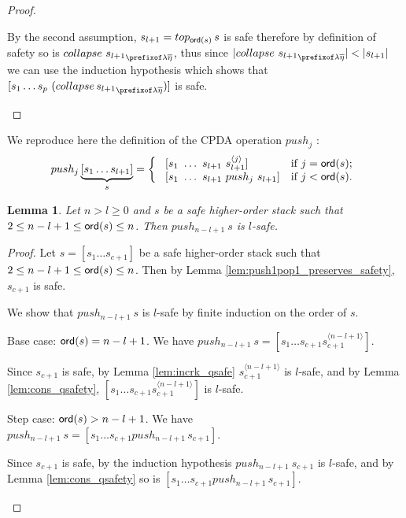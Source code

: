 \documentclass[a4paper]{article}
\newtheorem{lemma}{Lemma}[section]
\theoremstyle{remark}
\theoremstyle{definition}
\begin{document}
\begin{proof}
\begin{itemize}
By the second assumption, $s_{l+1} = top_{{\sf ord}(s)}\,s$ is safe therefore by definition
of safety so is $collapse~{s_{l+1}}_{\prefixof\lambda\overline\eta}$, thus
since $|collapse~{s_{l+1}}_{\prefixof\lambda\overline\eta}| < |s_{l+1}|$ we can use the induction hypothesis which shows that $[s_1 \ldots s_p\ (collapse\, {s_{l+1}}_{\prefixof\lambda\overline\eta}) ]$ is safe.
\qedhere
\end{itemize}
\end{proof}

We reproduce here the definition of the CPDA operation $push_j$ \cite{hmos-lics08}:
$$ push_j \underbrace{[ s_1 \ldots s_{l+1} ]}_{s} =
\left\{
  \begin{array}{ll}
\    [s_1\ \ldots\ s_{l+1}\ s_{l+1}^{\langle j \rangle}]  &\hbox{if $j = {\sf ord}(s)$;}\\
\    [s_1\ \ldots\ s_{l+1}\ push_j\ s_{l+1}]  &\hbox{if $j<{\sf ord}(s)$.}
 \end{array}
\right.
$$

\begin{lemma}
\label{lem:pushj_safe_implies_l-safe} Let $n>l\geq 0$ and $s$ be a safe higher-order stack such that $2 \leq n-l+1 \leq {\sf ord}(s) \leq n$. Then $push_{n-l+1}\ s$ is $l$-safe.
\end{lemma}
\begin{proof}
Let $s=[s_1 \ldots s_{c+1}]$ be a safe higher-order stack such that $2 \leq n-l+1 \leq {\sf ord}(s) \leq n$. Then by Lemma \ref{lem:push1pop1_preserves_safety}, $s_{c+1}$ is safe.

We show that $push_{n-l+1}~s$ is $l$-safe by finite induction on the order of $s$.
    \begin{compactitem}
      \item Base case: ${\sf ord}(s) = n-l+1 $. We have
    $push_{n-l+1}~s = [ s_1 \ldots s_{c+1} s_{c+1}^{\langle n-l+1
    \rangle}]$.

    Since $s_{c+1}$ is safe,  by Lemma \ref{lem:incrk_qsafe} $s_{c+1}^{\langle n-l+1\rangle}$ is $l$-safe, and by Lemma
    \ref{lem:cons_qsafety},  $[ s_1 \ldots s_{c+1} s_{c+1}^{\langle n-l+1
    \rangle}]$ is $l$-safe.

      \item Step case: ${\sf ord}(s) > n-l+1$. We have
    $push_{n-l+1}~s = [ s_1 \ldots s_{c+1} push_{n-l+1}\,s_{c+1}]$.

    Since $s_{c+1}$ is safe, by the
    induction hypothesis $push_{n-l+1}~s_{c+1}$ is $l$-safe, and by Lemma \ref{lem:cons_qsafety} so is $[ s_1 \ldots s_{c+1} push_{n-l+1}\,s_{c+1}]$.
\qedhere
    \end{compactitem}
\end{proof}
\end{document}
